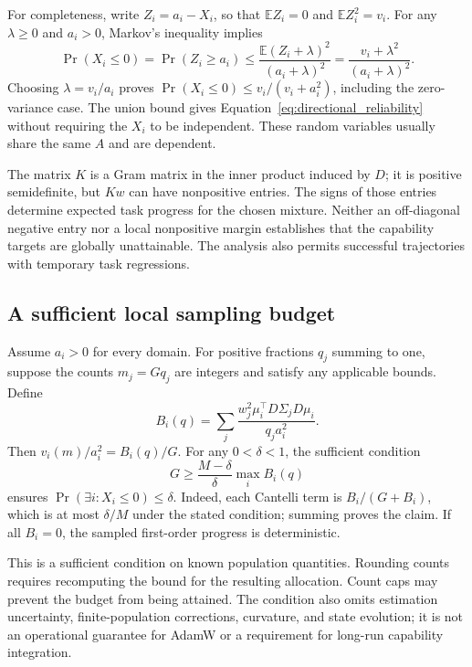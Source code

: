 For completeness, write $Z_i=a_i-X_i$, so that
$\mathbb E Z_i=0$ and $\mathbb E Z_i^2=v_i$. For any $\lambda\geq0$
and $a_i>0$, Markov's inequality implies
\begin{equation}
    \Pr(X_i\leq0)=\Pr(Z_i\geq a_i)
      \leq\frac{\mathbb E(Z_i+\lambda)^2}{(a_i+\lambda)^2}
      =\frac{v_i+\lambda^2}{(a_i+\lambda)^2}.
\end{equation}
Choosing $\lambda=v_i/a_i$ proves
$\Pr(X_i\leq0)\leq v_i/(v_i+a_i^2)$, including the zero-variance
case. The union bound gives Equation~\ref{eq:directional_reliability}
without requiring the $X_i$ to be independent. These random variables
usually share the same $A$ and are dependent.

The matrix $K$ is a Gram matrix in the inner product induced by $D$;
it is positive semidefinite, but $Kw$ can have nonpositive entries.
The signs of those entries determine expected task progress for the
chosen mixture. Neither an off-diagonal negative entry nor a local
nonpositive margin establishes that the capability targets are globally
unattainable. The analysis also permits successful trajectories with
temporary task regressions.

\subsection{A sufficient local sampling budget}
\label{app:budget_reliability}

Assume $a_i>0$ for every domain. For positive fractions $q_j$ summing
to one, suppose the counts $m_j=Gq_j$ are integers and satisfy any
applicable bounds. Define
\begin{equation}
    B_i(q)=\sum_j
        \frac{w_j^2\mu_i^\top D\Sigma_jD\mu_i}{q_j a_i^2}.
\end{equation}
Then $v_i(m)/a_i^2=B_i(q)/G$. For any $0<\delta<1$, the sufficient
condition
\begin{equation}
    G\geq\frac{M-\delta}{\delta}\max_i B_i(q)
    \label{eq:reliability_budget}
\end{equation}
ensures $\Pr(\exists i:X_i\leq0)\leq\delta$.
Indeed, each Cantelli term is $B_i/(G+B_i)$, which is at most
$\delta/M$ under the stated condition; summing proves the claim.
If all $B_i=0$, the sampled first-order progress is deterministic.

This is a sufficient condition on known population quantities. Rounding
counts requires recomputing the bound for the resulting allocation.
Count caps may prevent the budget from being attained. The condition
also omits estimation uncertainty, finite-population corrections,
curvature, and state evolution; it is not an operational guarantee for
AdamW or a requirement for long-run capability integration.

